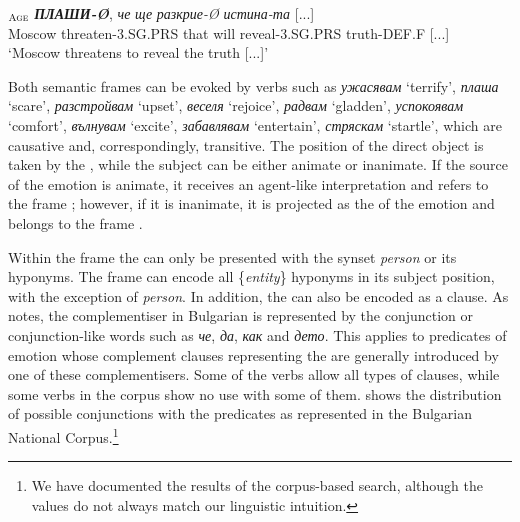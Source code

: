 \documentclass[output=paper,colorlinks,citecolor=brown]{langscibook}
\begin{document}
\begin{exe} 
\ex  \label{ch6:ex:30} 
$_{\text{\textsc{Age}}}$  {\textit{\textbf{ПЛАШИ-Ø}}}, \textit{че} \textit{ще} \textit{разкрие-Ø} \textit{истина-та}  [...] \\ 
{Moscow} {threaten-3.SG.PRS} {that} {will} {reveal-3.SG.PRS} {truth-DEF.F} [...]
\\%
\glt `Moscow threatens to reveal the truth [...]'
\end{exe}

Both semantic frames can be evoked by verbs such as \textit{ужасявам} `terrify', \textit{пла\-ша} `scare', \textit{разстройвам} `upset', \textit{веселя} `rejoice', \textit{радвам} `gladden', \textit{успокоявам} `comfort', \textit{вълнувам} `excite', \textit{забавлявам} `entertain', \textit{стряскам} `startle', which are causative and, correspondingly, transitive. The position of the direct object is taken by the , while the subject can be either animate or inanimate. If the source of the emotion is animate, it receives an agent-like interpretation and refers to the frame ; however, if it is inanimate, it is projected as the  of the emotion and belongs to the frame .

Within the frame  the  can only be presented with the synset {\textit{person}} or its hyponyms. The frame  can encode all \{\textit{entity}\} hyponyms in its subject position, with the exception of \textit{person}. In addition, the  can also be encoded as a clause. As \citet [18]{коева2021към} notes, the complementiser in Bulgarian is represented by the conjunction or conjunction-like words such as \textit{че}, \textit{да}, \textit{как} and \textit{дето}. This applies to predicates of emotion whose complement clauses representing the  are generally introduced by one of these complementisers.
Some of the verbs allow all types of clauses, while some verbs in the corpus show no use with some of them.  shows the distribution of possible conjunctions with the predicates as represented in the Bulgarian National Corpus.\footnote{We have documented the results of the corpus-based search, although the values do not always match our linguistic intuition.}
\end{document}
